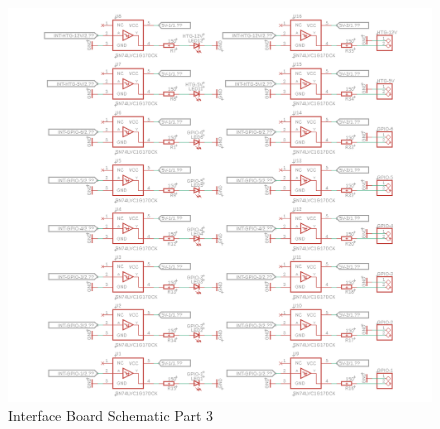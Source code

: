 \documentclass[12pt,a4paper,oneside]{article}
\begin{document}
%
\begin{figure}[H]
\centering
\includegraphics[width=1.1\linewidth]{figures/Interface_board_schematic_3.png}
\caption{Interface Board Schematic Part 3}
\label{fig:interface_sch3}
\end{figure}
%
\end{document}

